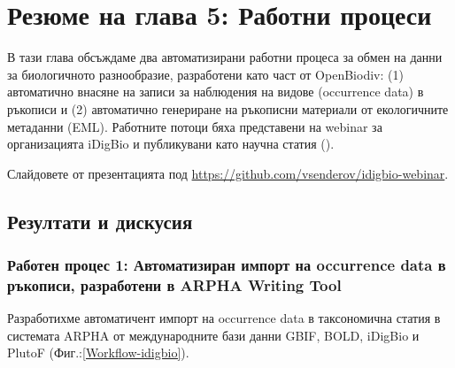 \chapter{Резюме на глава 5: Работни процеси}
\label{chapter-case-study}

В тази глава обсъждаме два автоматизирани работни процеса за обмен на данни за биологичното разнообразие, разработени като част от OpenBiodiv: (1) автоматично внасяне на записи за наблюдения на видове (occurrence data) в ръкописи и (2) автоматично генериране на ръкописни материали от екологичните метаданни (EML). Работните потоци бяха представени на webinar за организацията iDigBio и публикувани като научна статия (\cite{senderov_online_2016}).

Слайдовете от презентацията под \url{https://github.com/vsenderov/idigbio-webinar}.

\section{Резултати и дискусия}

\subsection{Работен процес 1: Автоматизиран импорт на occurrence data в ръкописи, разработени в ARPHA Writing Tool}

Разработихме автоматичент импорт на occurrence data в таксономична статия в системата ARPHA от международните бази данни GBIF, BOLD, iDigBio и PlutoF (Фиг.:\ref{Workflow-idigbio}).

